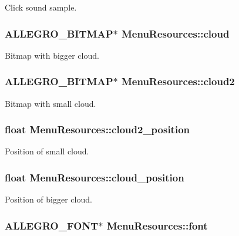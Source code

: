 Click sound sample. \hypertarget{structMenuResources_adacdc1bac116ee31ee6343f00db02a4b}{
\subsubsection[{cloud}]{\setlength{\rightskip}{0pt plus 5cm}A\+L\+L\+E\+G\+R\+O\+\_\+\+B\+I\+T\+M\+A\+P$\ast$ Menu\+Resources\+::cloud}}\label{structMenuResources_adacdc1bac116ee31ee6343f00db02a4b}
Bitmap with bigger cloud. \hypertarget{structMenuResources_a6ef8940eb594ce432b3073c1f16cf690}{
\subsubsection[{cloud2}]{\setlength{\rightskip}{0pt plus 5cm}A\+L\+L\+E\+G\+R\+O\+\_\+\+B\+I\+T\+M\+A\+P$\ast$ Menu\+Resources\+::cloud2}}\label{structMenuResources_a6ef8940eb594ce432b3073c1f16cf690}
Bitmap with small cloud. \hypertarget{structMenuResources_aef1e5d473ec00f1af2811cfcf45703bf}{
\subsubsection[{cloud2\+\_\+position}]{\setlength{\rightskip}{0pt plus 5cm}float Menu\+Resources\+::cloud2\+\_\+position}}\label{structMenuResources_aef1e5d473ec00f1af2811cfcf45703bf}
Position of small cloud. \hypertarget{structMenuResources_a11df2c99d7ff4f2435a02c8a162c99fd}{
\subsubsection[{cloud\+\_\+position}]{\setlength{\rightskip}{0pt plus 5cm}float Menu\+Resources\+::cloud\+\_\+position}}\label{structMenuResources_a11df2c99d7ff4f2435a02c8a162c99fd}
Position of bigger cloud. \hypertarget{structMenuResources_a859180da0537e52cf2813c2dc1f41e5e}{
\subsubsection[{font}]{\setlength{\rightskip}{0pt plus 5cm}A\+L\+L\+E\+G\+R\+O\+\_\+\+F\+O\+N\+T$\ast$ Menu\+Resources\+::font}}\label{structMenuResources_a859180da0537e52cf2813c2dc1f41e5e}
